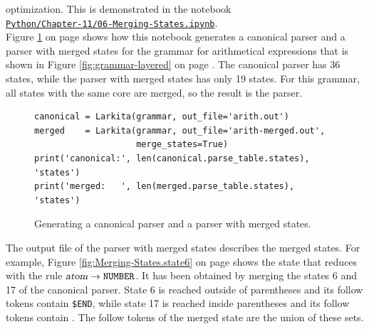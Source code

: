 optimization.  This is demonstrated in the notebook
\\[0.2cm]
\hspace*{1.3cm}
\href{https://github.com/karlstroetmann/Formal-Languages/tree/master/Python/Chapter-11/06-Merging-States.ipynb}{\texttt{Python/Chapter-11/06-Merging-States.ipynb}}.
\\[0.2cm]
Figure \ref{fig:Merging-States.ipynb} on page \pageref{fig:Merging-States.ipynb} shows how this notebook
generates a canonical parser and a parser with merged states for the grammar for arithmetical expressions that
is shown in Figure \ref{fig:grammar-layered} on page \pageref{fig:grammar-layered}.  The canonical parser has 36
states, while the parser with merged states has only 19 states.  For this grammar, all states with the same core
are merged, so the result is the  parser.

\begin{figure}[!ht]
\centering
\begin{verbatim}
canonical = Larkita(grammar, out_file='arith.out')
merged    = Larkita(grammar, out_file='arith-merged.out',
                    merge_states=True)
print('canonical:', len(canonical.parse_table.states), 'states')
print('merged:   ', len(merged.parse_table.states), 'states')
\end{verbatim}
\vspace*{-0.3cm}
\caption{Generating a canonical parser and a parser with merged states.}
\label{fig:Merging-States.ipynb}
\end{figure}

The output file of the parser with merged states describes the merged states.  For example, Figure
\ref{fig:Merging-States.state6} on page \pageref{fig:Merging-States.state6} shows the state that reduces with the
rule $\textsl{atom} \rightarrow \texttt{NUMBER}$.  It has been obtained by merging the states 6 and 17 of the
canonical parser.  State 6 is reached outside of parentheses and its follow tokens contain \texttt{\$END}, while
state 17 is reached inside parentheses and its follow tokens contain \saquoted{)}.  The follow tokens of the
merged state are the union of these sets.

